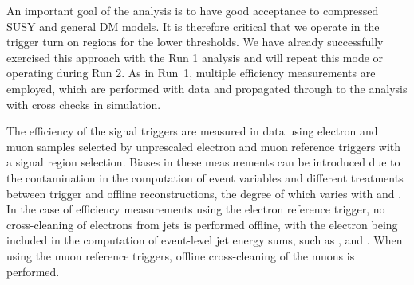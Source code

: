 An important goal of the analysis is to have good acceptance
to compressed SUSY and general DM models. It is therefore critical
that we operate in the trigger turn on regions for the lower
thresholds. We have already successfully exercised this approach with 
the Run 1 analysis and will repeat this mode or operating during Run 2.
As in Run~1, multiple efficiency measurements are
employed, which are performed with data and propagated through to the
analysis with cross checks in simulation. 



The efficiency of the signal triggers are measured in data using electron and muon samples 
selected by %
unprescaled electron and muon
reference triggers with a signal region selection. Biases in these measurements can be introduced 
due to the contamination in the computation of event variables and different treatments 
between trigger and offline reconstructions, the degree of which varies with
\scalht and \njet. In the case of efficiency measurements using the electron
reference trigger, no cross-cleaning of electrons from jets is performed
offline, with the electron being included in the computation of event-level jet
energy sums, such as \scalht, \MHT and \alt. When using the muon reference triggers, 
offline cross-cleaning of the muons is performed.



